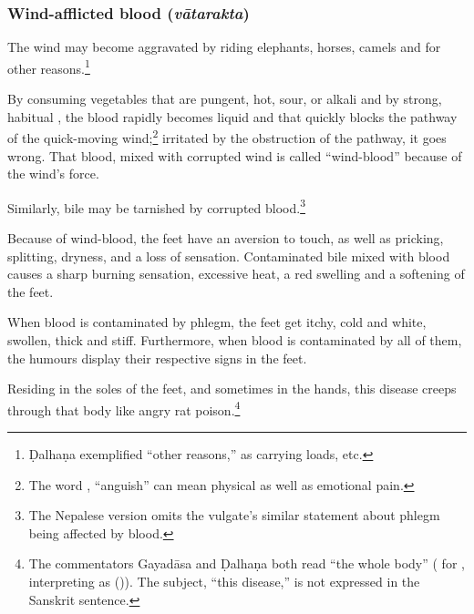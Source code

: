 \begin{translation}
\subsubsection{Wind-afflicted blood (\emph{vātarakta})}

\item[42--44]

The wind may become aggravated by riding elephants, horses, camels and
for other reasons.\footnote{Ḍalhaṇa exemplified “other reasons,” as
    carrying loads, etc.}

By consuming vegetables that are pungent, hot, sour, or alkali and by
strong, habitual , the blood rapidly becomes
liquid and that quickly blocks the pathway of the quick-moving
wind;\footnote{The word , “anguish” can mean physical as
    well as emotional pain.}  irritated by the obstruction of the pathway, it goes 
    wrong. 
%
That blood, mixed with corrupted wind is called 
“wind-blood” because of  the wind's force. 

Similarly, bile may be tarnished by corrupted blood.\footnote{The Nepalese version 
omits the vulgate's similar statement about phlegm being affected by blood.} 



	


\item[45--46]

	Because of wind-blood, the feet have an
    aversion to touch, as well as 
    pricking, splitting, dryness, and a loss of sensation. 
     Contaminated bile mixed with blood causes a sharp burning sensation,
	excessive heat, a red swelling and a softening of the feet.
    
        
When blood is contaminated by phlegm, the feet get itchy, cold and white, 
	swollen, thick and stiff.   
    	Furthermore, when blood is contaminated by all of them, the humours 
        display their respective signs in the feet.

\item[48]

	Residing in the soles of the feet, and sometimes in the hands, this disease 
	creeps through that body like angry rat poison.\footnote{The 
	commentators 
	Gayadāsa and Ḍalhaṇa both read “the whole body” ( for 
	, interpreting  as 
	(\cite[264]{vulgate})).  The subject, “this disease,” is not expressed in the 
	Sanskrit sentence.}



\end{translation}
